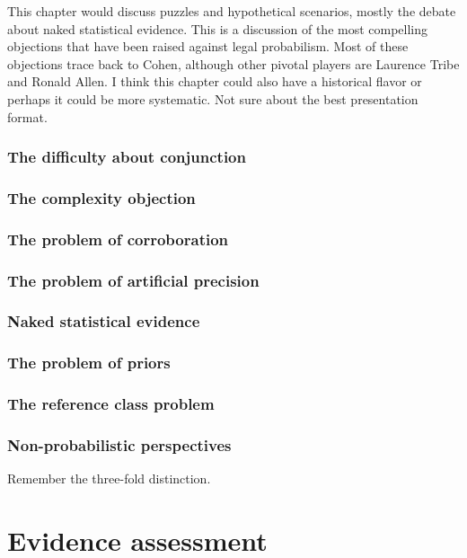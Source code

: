 \documentclass[]{book}
\begin{document}
This chapter would discuss puzzles and
hypothetical scenarios, mostly the debate
about naked statistical evidence. This
is a discussion of the most compelling objections that have
been raised against legal probabilism.
Most of these objections
trace back to Cohen, although
other pivotal players
are Laurence Tribe and Ronald Allen.
I think this chapter could
also have a historical flavor or perhaps it could be more
systematic. Not sure about
the best presentation format.

\section{The difficulty about conjunction}

\section{The complexity objection}

\section{The problem of corroboration}

\section{The problem of artificial precision}

\section{Naked statistical evidence}\label{sec:naked}

\section{The problem of priors}

\section{The reference class problem}

\section{Non-probabilistic perspectives}

Remember the three-fold distinction.

\part{Evidence assessment}
\end{document}

